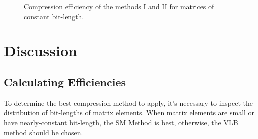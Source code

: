 \documentclass[10pt]{article}
\begin{document}
\begin{figure}[h]
  \caption{Compression efficiency of the methods I and II  for matrices of constant bit-length.}
  \label{fig:1819}
\end{figure}

\section*{Discussion}

\subsection*{Calculating Efficiencies}

To determine the best compression method to apply, it's necessary to inspect the distribution of bit-lengths of matrix elements. When matrix elements are small or have nearly-constant bit-length, the SM Method is best, otherwise, the VLB method should be chosen.
\end{document}
